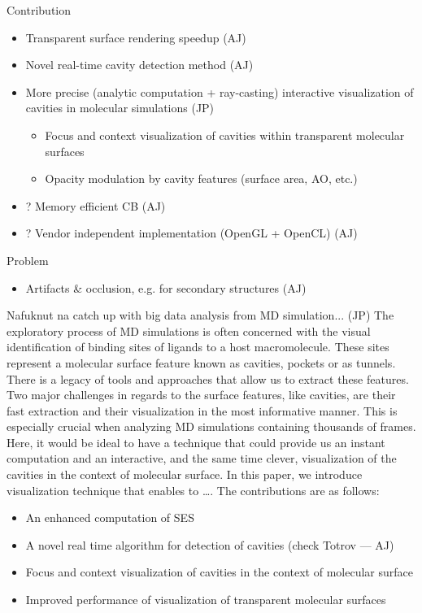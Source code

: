Contribution
\begin{itemize}
  \item Transparent surface rendering speedup (AJ)
	\item Novel real-time cavity detection method (AJ)
	\item More precise (analytic computation + ray-casting) interactive visualization of cavities in molecular simulations (JP)
	\begin{itemize}
		\item Focus and context visualization of cavities within transparent molecular surfaces
		\item Opacity modulation by cavity features (surface area, AO, etc.)
	\end{itemize}
	\item ? Memory efficient CB (AJ)
	\item ? Vendor independent implementation (OpenGL + OpenCL) (AJ)
\end{itemize}

Problem
\begin{itemize}
  \item Artifacts \& occlusion, e.g. for secondary structures (AJ)
\end{itemize}

Nafuknut na catch up with big data analysis from MD simulation... (JP)
The exploratory process of MD simulations is often concerned with the visual identification of binding sites of ligands to a host macromolecule. These sites represent a molecular surface feature known as cavities, pockets or as tunnels. There is a legacy of tools and approaches that allow us to extract these features. Two major challenges in regards to the surface features, like cavities, are their fast extraction and their visualization in the most informative manner. This is especially crucial when analyzing MD simulations containing thousands of frames. Here, it would be ideal to have a technique that could provide us an instant computation and an interactive, and the same time clever, visualization of the cavities in the context of molecular surface. In this paper, we introduce visualization technique that enables to  ….
The contributions are as follows:
\begin{itemize}
  \item An enhanced computation of SES
  \item A novel real time algorithm for detection of cavities (check Totrov --- AJ)
  \item Focus and context visualization of cavities in the context of molecular surface
  \item Improved performance of visualization of transparent molecular surfaces
\end{itemize}